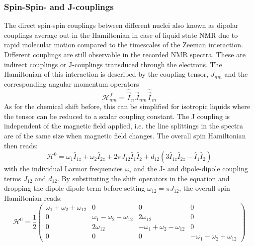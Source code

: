         \subsubsection{Spin-Spin- and J-couplings}
            The direct spin-spin couplings between different nuclei also known as dipolar couplings average out in the Hamiltonian in case of liquid state NMR due to rapid molecular motion compared to the timescales of the Zeeman interaction. Different couplings are still observable in the recorded NMR spectra. These are indirect couplings or J-couplings transduced through the electrons. The Hamiltonian of this interaction is described by the coupling tensor, $J_{nm}$ and the corresponding angular momentum operators
            \begin{equation}
                \mathcal{H}^J_{nm} = \hat{\vec I}_n \vec J_{nm} \hat{\vec I}_m
            \end{equation}
            As for the chemical shift before, this can be simplified for isotropic liquids where the tensor can be reduced to a scalar coupling constant. The J coupling is independent of the magnetic field applied, i.e. the line splittings in the spectra are of the same size when magnetic field changes. The overall spin Hamiltonian then reads:
            \begin{equation}
                \mathcal{H}^0 = \omega_1\hat{I}_{1z} + \omega_2\hat{I}_{2z} + 2\pi J_{12}\hat{I}_1\hat{I}_2 + d_{12}(3\hat{I}_{1z}\hat{I}_{2z} - \hat{I}_1\hat{I}_2)
            \end{equation}
            with the individual Larmor frequencies $\omega_i$ and the J- and dipole-dipole coupling terms $J_{12}$ and $d_{12}$.
            By substituting the shift operators in the equation and dropping the dipole-dipole term before setting $\omega_{12} = \pi J_{12}$, the overall spin Hamiltonian reads:
            \begin{equation}
                \mathcal{H}^0 = \frac{1}{2}
                \begin{pmatrix}
                    \omega_1+\omega_2+\omega_{12} & 0 & 0 & 0\\
                    0 & \omega_1-\omega_2-\omega_{12} & 2\omega_{12} & 0 \\
                    0 & 2\omega_{12} & -\omega_1+\omega_2-\omega_{12} & 0\\
                    0 & 0 & 0 & -\omega_1-\omega_2+\omega_{12}
                \end{pmatrix}
            \end{equation}
